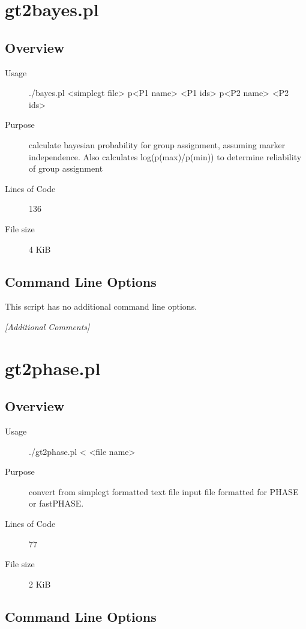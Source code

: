 \section{gt2bayes.pl}
\label{sec:gt2bayes.pl}

\subsection{Overview}
\label{sec:gt2bayes.pl-overview}

\begin{description}
\item[Usage] ./bayes.pl <simplegt file> p<P1 name> <P1 ids> p<P2 name> <P2 ids>
\item[Purpose] calculate bayesian probability for group assignment, assuming marker independence. Also calculates log(p(max)/p(min)) to determine reliability of group assignment
\item[Lines of Code] 136
\item[File size] 4 KiB
\end{description}

\subsection{Command Line Options}
\label{sec:gt2bayes.pl-command-line}

This script has no additional command line options.

\emph{[Additional Comments]}

\section{gt2phase.pl}
\label{sec:gt2phase.pl}

\subsection{Overview}
\label{sec:gt2phase.pl-overview}

\begin{description}
\item[Usage] ./gt2phase.pl < <file name>
\item[Purpose] convert from simplegt formatted text file input file formatted for PHASE or fastPHASE.
\item[Lines of Code] 77
\item[File size] 2 KiB
\end{description}

\subsection{Command Line Options}
\label{sec:gt2phase.pl-command-line}

